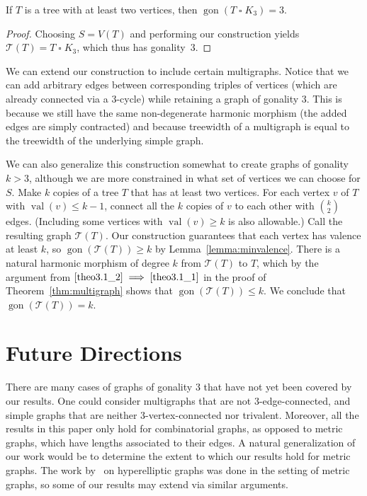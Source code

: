 \documentclass[ALCO,ThmDefs,Unicode,epreuves]{cedram}
\newcommand\boxempty{\mathrel{\square}}
\newcommand{\mathscr}[1]{\mathcal{#1}}
\DeclareMathOperator{\gon}{gon}
\DeclareMathOperator{\val}{val}
\begin{document}
\begin{coro}
If $T$ is a tree with at least two vertices, then $\gon (T\boxempty K_3)=3$.
\end{coro}

\begin{proof} Choosing $S=V(T)$ and performing our construction yields $\mathscr{T}(T)=T\boxempty K_3$, which thus has gonality~$3$.
\end{proof}

We can extend our construction to include certain multigraphs. Notice that we can add arbitrary edges between corresponding triples of vertices (which are already connected via a $3$-cycle) while retaining a graph of gonality $3$. This is because we still have the same non-degenerate harmonic morphism (the added edges are simply contracted) and because treewidth of a multigraph is equal to the treewidth of the underlying simple graph.



We can also generalize this construction somewhat to create graphs of gonality $k> 3$, although we are more constrained in what set of vertices we can choose for $S$. Make $k$ copies of a tree $T$ that has at least two vertices. For each vertex $v$ of $T$ with $\val (v)\leq k-1$, connect all the $k$ copies of $v$ to each other with $\binom{k}{2}$ edges. (Including some vertices with $\val (v)\geq k$ is also allowable.) Call the resulting graph $\mathscr{T}(T)$. Our construction guarantees that each vertex has valence at least $k$, so $\gon (\mathscr{T}(T))\geq k$ by Lemma~\ref{lemma:minvalence}. There is a natural harmonic morphism of degree $k$ from $\mathscr{T}(T)$ to $T$, which by the argument from $\eqref{theo3.1_2} \implies \eqref{theo3.1_1}$ in the proof of Theorem~\ref{thm:multigraph} shows that $\gon (\mathscr{T}(T))\leq k$. We conclude that $\gon (\mathscr{T}(T))= k$.






\section{Future Directions}

There are many cases of graphs of gonality $3$ that have not yet been covered by our results. One could consider multigraphs that are not 3-edge-connected, and simple graphs that are neither 3-vertex-connected nor trivalent. Moreover, all the results in this paper only hold for combinatorial graphs, as opposed to metric graphs, which have lengths associated to their edges. A natural generalization of our work would be to determine the extent to which our results hold for metric graphs. The work by~\cite{chan} on hyperelliptic graphs was done in the setting of metric graphs, so some of our results may extend via similar arguments.
\end{document}

